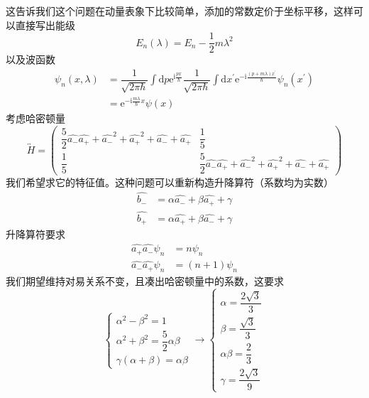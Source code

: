 \documentclass[12pt, a4paper, oneside]{ctexart}
\begin{document}
	\quad\quad 这告诉我们这个问题在动量表象下比较简单，添加的常数定价于坐标平移，这样可以直接写出能级
	\begin{equation}
		E_{n}(\lambda)=E_{n}-\dfrac{1}{2}m\lambda^{2}
	\end{equation}
	\quad\quad 以及波函数
	\begin{align}
		\psi_{n}(x,\lambda)&=\dfrac{1}{\sqrt{2\pi\hbar}}\int\mathrm{d}p\mathrm{e}^{\mathrm{i}\frac{px}{\hbar}}\dfrac{1}{\sqrt{2\pi\hbar}}\int\mathrm{d}x^{\prime}\mathrm{e}^{-\mathrm{i}\frac{\left(p+m\lambda\right)x^{\prime}}{\hbar}}\psi_{n}\left(x^{\prime}\right)\\
		&=\mathrm{e}^{-\mathrm{i}\frac{m\lambda}{\hbar}x}\psi(x)
	\end{align}
	\quad\quad 考虑哈密顿量
	\begin{equation}
		\overleftrightarrow{H}=\begin{pmatrix}
		\dfrac{5}{2}\hat{a_{-}}\hat{a_{+}}+\hat{a_{-}}^{2}+\hat{a_{+}}^{2}+\hat{a_{-}}+\hat{a_{+}}	& \dfrac{1}{5}\\ 
		\dfrac{1}{5}	&\dfrac{5}{2}\hat{a_{-}}\hat{a_{+}}+\hat{a_{-}}^{2}+\hat{a_{+}}^{2}+\hat{a_{-}}+\hat{a_{+}}
		\end{pmatrix}
	\end{equation}
	\quad\quad 我们希望求它的特征值。这种问题可以重新构造升降算符（系数均为实数）
	\begin{align}
		\hat{b_{-}}&=\alpha\hat{a_{-}}+\beta\hat{a_{+}}+\gamma\\
		\hat{b_{+}}&=\alpha\hat{a_{+}}+\beta\hat{a_{-}}+\gamma
	\end{align}
	\quad\quad 升降算符要求
	\begin{align}
		\hat{a_{+}}\hat{a_{-}}\psi_{n}&=n\psi_{n}\\
		\hat{a_{-}}\hat{a_{+}}\psi_{n}&=\left(n+1\right)\psi_{n}
	\end{align}
	\quad\quad 我们期望维持对易关系不变，且凑出哈密顿量中的系数，这要求
	\begin{equation}
		\left\{\begin{matrix}
		\alpha^{2}-\beta^{2}=1	\\
		\alpha^{2}+\beta^{2}=\dfrac{5}{2}\alpha\beta	\\
		\gamma\left(\alpha+\beta\right)=\alpha\beta
		\end{matrix}\right.\to
		\left\{\begin{matrix}
			\alpha=\dfrac{2\sqrt{3}}{3} \\
			\beta=\dfrac{\sqrt{3}}{3}\\
			\alpha\beta=\dfrac{2}{3}\\
			\gamma=\dfrac{2\sqrt{3}}{9}
		\end{matrix}\right.
	\end{equation}
\end{document}
